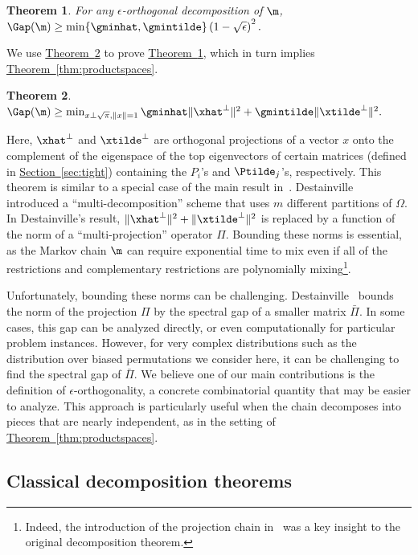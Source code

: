 \documentclass[11pt]{article}
\newtheorem{theorem}{Theorem}[section]
\providecommand{\expref}[2]{\texorpdfstring{\hyperref[#2]{#1~\ref{#2}}}{#1~\ref{#2}}}
\providecommand{\Perp}[1]{#1^{\perp}}
\begin{document}
\begin{theorem}\label{thm:indep}
For any $\epsilon$-orthogonal decomposition of $\m$, $\Gap(\m) 
\geq \min\{\gminhat, \gmintilde\}\left(1 -\sqrt{\epsilon}\right)^2.$
\end{theorem}

\noindent
We use \expref{Theorem}{thm:primaldual} to prove \expref{Theorem}{thm:indep},
which in turn implies \expref{Theorem}{thm:productspaces}.

\begin{theorem}\label{thm:primaldual}
$\Gap(\m)\geq \min_{x\perp \sqrt{\pi}, \|x\|=1}  
\gminhat\|\Perp{\xhat}\|^2+\gmintilde\|\Perp{\xtilde}\|^2.$
\end{theorem}

Here, $\Perp{\xhat}$ and $\Perp{\xtilde}$ are orthogonal projections of 
a vector $x$ onto the complement of the eigenspace of the top 
eigenvectors of certain matrices (defined in \expref{Section}{sec:tight}) 
containing the $P_i$'s and $\Ptilde_j$'s, respectively. This theorem is 
similar to a special case of the main result in~\cite{Dest03}. 
Destainville~\cite{Dest03} introduced a ``multi-decomposition'' scheme 
that uses $m$ different partitions of $\Omega$. In Destainville's 
result, $\|\Perp{\xhat}\|^2+\|\Perp{\xtilde}\|^2$ is replaced by a 
function of the norm of a ``multi-projection'' operator $\Pi$. Bounding 
these norms is essential, as the Markov chain $\m$ can require 
exponential time to mix even if all of the restrictions and 
complementary restrictions are polynomially mixing\footnote{Indeed, the 
introduction of the projection chain in~\cite{madr} was a key insight 
to the original decomposition theorem.}.

Unfortunately, bounding these norms can be challenging. 
Destainville~\cite{Dest03} bounds the norm of the projection $\Pi$ by 
the spectral gap of a smaller matrix $\bar{\Pi}$. In some cases, this 
gap can be analyzed directly, or even computationally for particular 
problem instances. However, for very complex distributions such as the 
distribution over biased permutations we consider here, it can be 
challenging to find the spectral gap of $\bar{\Pi}$. We believe one of 
our main contributions is the definition of $\epsilon$-orthogonality, a 
concrete combinatorial quantity that may be easier to analyze.  This 
approach is particularly useful when the chain decomposes into pieces 
that are nearly independent, as in the setting of 
\expref{Theorem}{thm:productspaces}.

\subsection{Classical decomposition theorems}\label{sec:classcomp}
\end{document}
